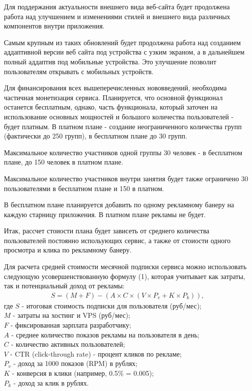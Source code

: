 \documentclass[a4paper,14pt,oneside]{extreport}
\begin{document}
Для поддержания актуальности внешнего вида веб-сайта будет продолжена работа над улучшением и изменениями стилей и внешнего вида различных компонентов внутри приложения.

Самым крупным из таких обновлений будет продолжена работа над созданием аддаптивной версии веб сайта под устройства с узким экраном, а в дальнейшем полный аддаптив под мобильные устройства. Это улучшение позволит пользователям открывать  с мобильных устройств.

Для финансирования всех вышеперечисленных нововведений, необходима частичная монетизация сервиса. Планируется, что основной функционал останется бесплатным, однако, часть функционала, который заточен на использование основных мощностей и большого количества пользователей - будет платным.
В платном плане - создание неограниченного количества групп (фактически до 250 групп), в бесплатном плане до 30 групп.

Максимальное количество участников одной группы 30 человек -  в бесплатном плане, до 150 человек в платном плане.

Максимальное количество участников внутри занятия будет также ограничено 30 пользователями в бесплатном плане и 150 в платном.

В бесплатном плане планируется добавить по одному рекламному банеру на каждую старницу приложения. В платном плане рекламы не будет.

Итак, рассчет стоиости плана будет зависеть от среднего количества пользователей постоянно испольующих сервис, а также от стоиости одного просмотра и клика по рекламному банеру. 

Для расчета средней стоимости месячной подписки сервиса можно использовать следующую усовершенствованную формулу (1), которая учитывает как затраты, так и потенциальный доход от рекламы:
{\setlength{\abovedisplayskip}{0pt} %
 \setlength{\belowdisplayskip}{0pt} %
\begin{align}
S = (M + F) - (A \times C \times (V \times P_v + K \times P_k)),
\end{align}
}
где \(S\) - итоговая стоимость подписки для пользователя (руб/мес); \\ 
\(M\) - затраты на хостинг и VPS (руб/мес);\\
\(F\) - фиксированная зарплата разработчику;\\
\(A\) - среднее количество показов рекламы на пользователя в день;\\
\(C\) - количество активных пользователей;\\
\(V\) - CTR (click-through rate) - процент кликов по рекламе;\\
\(P_v\) - доход за 1000 показов (RPM) в рублях;\\
\(K\) - конверсия в клики (например, 0.5\% = 0.005);\\
\(P_k\) - доход за клик в рублях.
\end{document}
